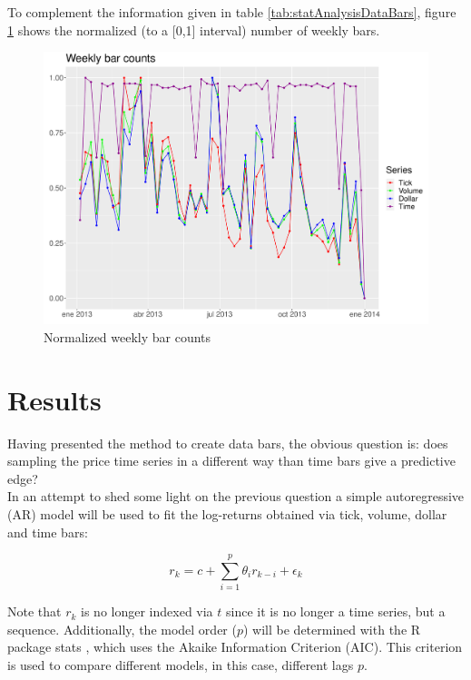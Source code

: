 To complement the information given in table \ref{tab:statAnalysisDataBars}, 
figure \ref{fig:weeklyBarCounts} shows the normalized (to a [0,1] interval) 
number of weekly bars.

\begin{figure}[htbp]
	\centering
	\includegraphics[scale=.35]{img/dataBars/weeklyBarCounts}
	\caption{Normalized weekly bar counts}
	\label{fig:weeklyBarCounts}
\end{figure}

\section{Results}
\label{sec:ARResults}
Having presented the method to create data bars, the obvious question is: 
does sampling the price time series in a different way than time bars give a 
predictive edge?\\

In an attempt to shed some light on the previous question a simple 
autoregressive (AR) model will be used to fit the log-returns obtained via 
tick, volume, dollar and time bars:

\begin{equation*}
	r_k = c + \sum_{i = 1}^{p} \theta_i r_{k - i} + \epsilon_k
\end{equation*}

Note that $r_k$ is no longer indexed via $t$ since it is no longer a time 
series, but a sequence. Additionally, the model order ($p$) will be 
determined with the R package stats \cite{RStats}, which uses the Akaike 
Information Criterion (AIC). This criterion is used to compare different 
models, in this case, different lags $p$.\\

